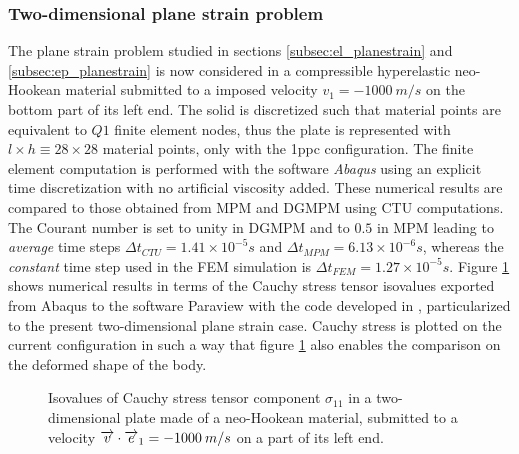 \subsubsection*{Two-dimensional plane strain problem}
%   
The plane strain problem studied in sections \ref{subsec:el_planestrain} and \ref{subsec:ep_planestrain} is now considered in a compressible hyperelastic neo-Hookean material submitted to a imposed velocity $v_1=-1000 \: m/s$ on the bottom part of its left end.
The solid is discretized such that material points are equivalent to $Q1$ finite element nodes, thus the plate is represented with $l \times h \equiv 28 \times 28$ material points, only with the 1ppc configuration.
The finite element computation is performed with the software \textit{Abaqus} \cite{Abaqus} using an explicit time discretization with no artificial viscosity added.
These numerical results are compared to those obtained from MPM and DGMPM using CTU computations.
The Courant number is set to unity in DGMPM and to $0.5$ in MPM leading to \textit{average} time steps $\Delta t_{CTU}=1.41 \times 10^{-5}s$ and $\Delta t_{MPM}=6.13 \times 10^{-6}s$, whereas the \textit{constant} time step used in the FEM simulation is $\Delta t_{FEM}=1.27 \times 10^{-5} s$.
Figure \ref{fig:2dhe_stress} shows numerical results in terms of the Cauchy stress tensor isovalues exported from Abaqus to the software Paraview \cite{Paraview} with the code developed in \cite{Export_Abaqus}, particularized to the present two-dimensional plane strain case.
Cauchy stress is plotted on the current configuration in such a way that figure \ref{fig:2dhe_stress} also enables the comparison on the deformed shape of the body.
\begin{figure}[h!]
  \centering
  
  \caption{Isovalues of Cauchy stress tensor component $\sigma_{11}$ in a two-dimensional plate made of a neo-Hookean material, submitted to a velocity ${\overrightarrow{v}}\cdot{\overrightarrow{e}}_1=-1000 \: m/s$ on a part of its left end.}
  \label{fig:2dhe_stress}
\end{figure}
